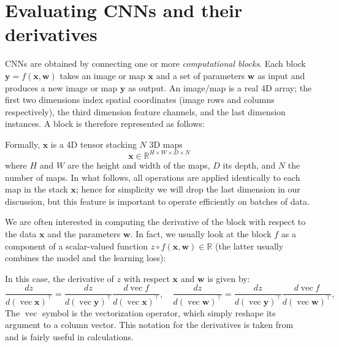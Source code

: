 \documentclass[12pt]{article}
\newcommand{\real}{\mathbb{R}}
\newcommand{\vv}{\operatorname{vec}}
\newcommand{\bx}{\mathbf{x}}
\newcommand{\by}{\mathbf{y}}
\newcommand{\bw}{\mathbf{w}}
\begin{document}
\section{Evaluating CNNs and their derivatives}

CNNs are obtained by connecting one or more \emph{computational blocks}. Each block $\by = f(\bx,\bw)$ takes an image or map $\bx$ and a set of parameters $\bw$ as input and produces a new image or map $\by$ as output. An image/map is a real 4D array; the first two dimensions index spatial coordinates (image rows and columns respectively), the third dimension feature channels, and the last dimension instances. A block is therefore represented as follows:
\begin{center}
\end{center}
Formally, $\bx$ is a 4D tensor stacking $N$ 3D maps
\[
   \bx \in \real^{H \times W \times D \times N}
\]
where $H$ and $W$ are the height and width of the maps, $D$ its depth, and $N$ the number of maps. In what follows, all operations are applied identically to each map in the stack $\bx$; hence for simplicity we will drop the last dimension in our discussion, but this feature is important to operate efficiently on batches of data.

We are often interested in computing the derivative of the block with respect to the data $\bx$ and the parameters $\bw$. In fact, we usually look at the block $f$ as a component of a scalar-valued function $z \circ f(\bx,\bw) \in \real$ (the latter usually combines the model and the learning loss):
\begin{center}
\end{center}
In this case, the derivative of $z$ with respect $\bx$ and $\bw$ is given by:
\[
\frac{dz}{d(\vv \bx)^\top}
=
\frac{dz}{d(\vv \by)^\top}
\frac{d\vv f}{d(\vv \bx)^\top},
\quad
\frac{dz}{d(\vv \bw)^\top}
=
\frac{dz}{d(\vv \by)^\top}
\frac{d\vv f}{d(\vv \bw)^\top},
\]
The $\vv$ symbol is the vectorization operator, which simply reshape its argument to a column vector. This notation for the derivatives is taken from~\cite{kinghorn96integrals} and is fairly useful in calculations.
\end{document}

